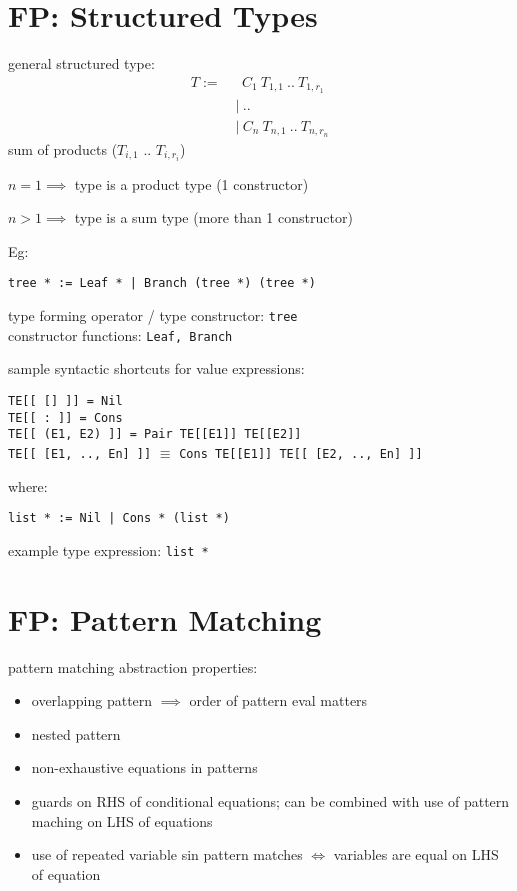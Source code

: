 \documentclass[8pt]{extarticle}
\begin{document}
\begin{multicols*}{2}
  \vfill\null
  \columnbreak
  
  \section{FP: Structured Types}
  
  general structured type:
  \begin{align*}
    T :=\ & \ \ C_1\ T_{1,1}\ ..\ T_{1, r_1}\\
          & |\ ..\\
          & |\ C_n\ T_{n,1}\ ..\ T_{n, r_n}
  \end{align*}
  sum of products ($T_{i,1}$ .. $T_{i,r_i}$)

  $n=1 \implies$ type is a product type (1 constructor)
  
  $n>1 \implies$ type is a sum type (more than 1 constructor)
  
  Eg:
  
  \verb#tree * := Leaf * | Branch (tree *) (tree *)#

  type forming operator / type constructor: \verb|tree|\\
  constructor functions: \verb|Leaf, Branch|

  sample syntactic shortcuts for value expressions:

  \verb|TE[[ [] ]] = Nil|\\
  \verb|TE[[ : ]] = Cons|\\
  \verb|TE[[ (E1, E2) ]] = Pair TE[[E1]] TE[[E2]]|\\
  \verb|TE[[ [E1, .., En] ]]| $\equiv$ \verb|Cons TE[[E1]] TE[[ [E2, .., En] ]]|

  where:

  \verb#list * := Nil | Cons * (list *)#

  example type expression: \verb|list *|
  
  \section{FP: Pattern Matching}

  pattern matching abstraction properties:
  \begin{itemize}
  \item overlapping pattern $\implies$ order of pattern eval matters
  \item nested pattern
  \item non-exhaustive equations in patterns
  \item guards on RHS of conditional equations; can be combined with use of pattern maching on LHS of equations
  \item use of repeated variable sin pattern matches $\iff$ variables are equal on LHS of equation
  \end{itemize}


\end{multicols*}
\end{document}
